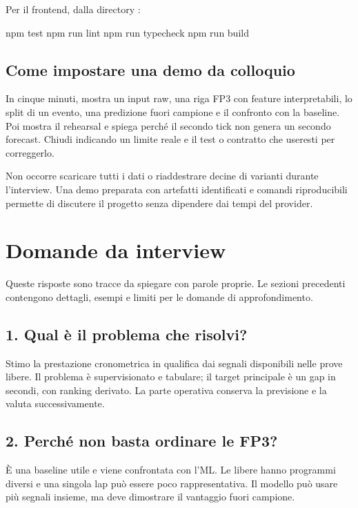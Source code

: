 \documentclass[11pt,a4paper]{article}
\newcommand{\code}[1]{{\ttfamily\small\seqsplit{#1}}}
\begin{document}
Per il frontend, dalla directory \code{web}:

\begin{CodeBlock}
npm test
npm run lint
npm run typecheck
npm run build
\end{CodeBlock}

\subsection{Come impostare una demo da colloquio}\label{come-impostare-una-demo-da-colloquio}

In cinque minuti, mostra un input raw, una riga FP3 con feature interpretabili, lo split di un evento, una predizione fuori campione e il confronto con la baseline. Poi mostra il rehearsal e spiega perché il secondo tick non genera un secondo forecast. Chiudi indicando un limite reale e il test o contratto che useresti per correggerlo.

Non occorre scaricare tutti i dati o riaddestrare decine di varianti durante l'interview. Una demo preparata con artefatti identificati e comandi riproducibili permette di discutere il progetto senza dipendere dai tempi del provider.

\section{Domande da interview}\label{domande-da-interview}

Queste risposte sono tracce da spiegare con parole proprie. Le sezioni precedenti contengono dettagli, esempi e limiti per le domande di approfondimento.

\subsection{1. Qual è il problema che risolvi?}\label{qual-uxe8-il-problema-che-risolvi}

Stimo la prestazione cronometrica in qualifica dai segnali disponibili nelle prove libere. Il problema è supervisionato e tabulare; il target principale è un gap in secondi, con ranking derivato. La parte operativa conserva la previsione e la valuta successivamente.

\subsection{2. Perché non basta ordinare le FP3?}\label{perchuxe9-non-basta-ordinare-le-fp3}

È una baseline utile e viene confrontata con l'ML. Le libere hanno programmi diversi e una singola lap può essere poco rappresentativa. Il modello può usare più segnali insieme, ma deve dimostrare il vantaggio fuori campione.
\end{document}
